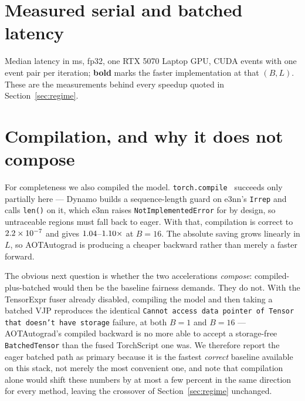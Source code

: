 \documentclass{article}
\begin{document}
\section{Measured serial and batched latency}
\label{app:latency}
\begin{center}\small

\end{center}
\vspace{-0.4em}
{\small Median latency in ms, fp32, one RTX 5070 Laptop GPU, CUDA events with one event pair per
iteration; \textbf{bold} marks the faster implementation at that $(B,L)$. These are the measurements
behind every speedup quoted in Section~\ref{sec:regime}.}

\section{Compilation, and why it does not compose}
\label{app:compile}
For completeness we also compiled the model. \texttt{torch.compile}~\citep{torchcompile} succeeds only partially here ---
Dynamo builds a sequence-length guard on e3nn's \texttt{Irrep} and calls \texttt{len()} on it, which
e3nn raises \texttt{NotImplementedError} for by design, so untraceable regions must fall back to
eager. With that, compilation is correct to $2.2\times10^{-7}$ and gives
$1.04$--$1.10\times$ at $B{=}16$. The absolute saving grows linearly in
$L$, so AOTAutograd is producing a cheaper backward rather than merely a faster forward.

The obvious next question is whether the two accelerations \emph{compose}: compiled-plus-batched
would then be the baseline fairness demands. They do not. With the TensorExpr fuser already disabled,
compiling the model and then taking a batched VJP reproduces the identical
\texttt{Cannot access data pointer of Tensor that doesn't have storage} failure, at both $B{=}1$ and
$B{=}16$ --- AOTAutograd's compiled backward is no more able to accept a storage-free
\texttt{BatchedTensor} than the fused TorchScript one was. We therefore report the eager batched
path as primary because it is the fastest \emph{correct} baseline available on this stack, not
merely the most convenient one, and note that compilation alone would shift these numbers by at most
a few percent in the same direction for every method, leaving the crossover of
Section~\ref{sec:regime} unchanged.
\end{document}
